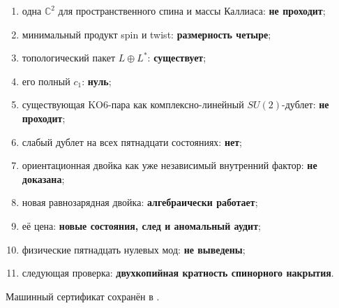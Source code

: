 \begin{protocol}
\begin{enumerate}
 \item одна $\mathbb C^2$ для пространственного спина и массы Каллиаса: \textbf{не проходит};
 \item минимальный продукт spin и twist: \textbf{размерность четыре};
 \item топологический пакет $L\oplus L^*$: \textbf{существует};
 \item его полный $c_1$: \textbf{нуль};
 \item существующая KO6-пара как комплексно-линейный $SU(2)$-дублет:
 \textbf{не проходит};
 \item слабый дублет на всех пятнадцати состояниях: \textbf{нет};
 \item ориентационная двойка как уже независимый внутренний фактор:
 \textbf{не доказана};
 \item новая равнозарядная двойка: \textbf{алгебраически работает};
 \item её цена: \textbf{новые состояния, след и аномальный аудит};
 \item физические пятнадцать нулевых мод: \textbf{не выведены};
 \item следующая проверка: \textbf{двухкопийная кратность спинорного накрытия}.
\end{enumerate}
\end{protocol}

Машинный сертификат сохранён в
.